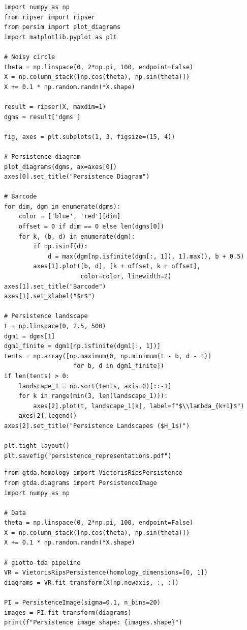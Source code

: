 \begin{codeblock}[title=\textbf{Visualizing Diagrams and Barcodes}]
\begin{verbatim}
import numpy as np
from ripser import ripser
from persim import plot_diagrams
import matplotlib.pyplot as plt

# Noisy circle
theta = np.linspace(0, 2*np.pi, 100, endpoint=False)
X = np.column_stack([np.cos(theta), np.sin(theta)])
X += 0.1 * np.random.randn(*X.shape)

result = ripser(X, maxdim=1)
dgms = result['dgms']

fig, axes = plt.subplots(1, 3, figsize=(15, 4))

# Persistence diagram
plot_diagrams(dgms, ax=axes[0])
axes[0].set_title("Persistence Diagram")

# Barcode
for dim, dgm in enumerate(dgms):
    color = ['blue', 'red'][dim]
    offset = 0 if dim == 0 else len(dgms[0])
    for k, (b, d) in enumerate(dgm):
        if np.isinf(d):
            d = max(dgm[np.isfinite(dgm[:, 1]), 1].max(), b + 0.5)
        axes[1].plot([b, d], [k + offset, k + offset],
                     color=color, linewidth=2)
axes[1].set_title("Barcode")
axes[1].set_xlabel("$r$")

# Persistence landscape
t = np.linspace(0, 2.5, 500)
dgm1 = dgms[1]
dgm1_finite = dgm1[np.isfinite(dgm1[:, 1])]
tents = np.array([np.maximum(0, np.minimum(t - b, d - t))
                   for b, d in dgm1_finite])
if len(tents) > 0:
    landscape_1 = np.sort(tents, axis=0)[::-1]
    for k in range(min(3, len(landscape_1))):
        axes[2].plot(t, landscape_1[k], label=f"$\\lambda_{k+1}$")
    axes[2].legend()
axes[2].set_title("Persistence Landscapes ($H_1$)")

plt.tight_layout()
plt.savefig("persistence_representations.pdf")
\end{verbatim}
\end{codeblock}

\begin{codeblock}[title=\textbf{Persistence Images with giotto-tda}]
\begin{verbatim}
from gtda.homology import VietorisRipsPersistence
from gtda.diagrams import PersistenceImage
import numpy as np

# Data
theta = np.linspace(0, 2*np.pi, 100, endpoint=False)
X = np.column_stack([np.cos(theta), np.sin(theta)])
X += 0.1 * np.random.randn(*X.shape)

# giotto-tda pipeline
VR = VietorisRipsPersistence(homology_dimensions=[0, 1])
diagrams = VR.fit_transform(X[np.newaxis, :, :])

PI = PersistenceImage(sigma=0.1, n_bins=20)
images = PI.fit_transform(diagrams)
print(f"Persistence image shape: {images.shape}")
\end{verbatim}
\end{codeblock}


